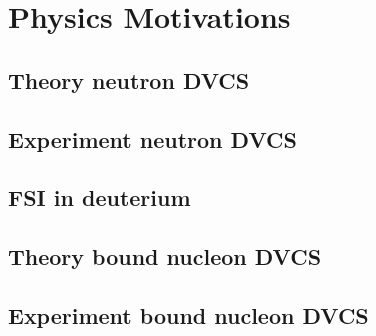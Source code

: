 
\chapter{Physics Motivations}
\label{chap:physics}

\section{Theory neutron DVCS}
\section{Experiment neutron DVCS}
\section{FSI in deuterium}
\section{Theory bound nucleon DVCS}
\section{Experiment bound nucleon DVCS}
